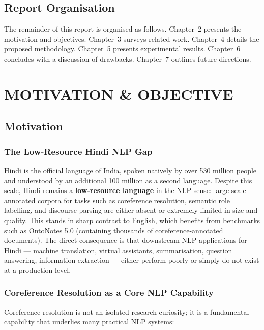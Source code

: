 \documentclass[12pt,a4paper]{report}
\begin{document}
\section{Report Organisation}

The remainder of this report is organised as follows. Chapter~2 presents the motivation and objectives. Chapter~3 surveys related work. Chapter~4 details the proposed methodology. Chapter~5 presents experimental results. Chapter~6 concludes with a discussion of drawbacks. Chapter~7 outlines future directions.


\chapter{MOTIVATION \& OBJECTIVE}

\section{Motivation}

\subsection{The Low-Resource Hindi NLP Gap}

Hindi is the official language of India, spoken natively by over 530 million people and understood by an additional 100 million as a second language. Despite this scale, Hindi remains a \textbf{low-resource language} in the NLP sense: large-scale annotated corpora for tasks such as coreference resolution, semantic role labelling, and discourse parsing are either absent or extremely limited in size and quality. This stands in sharp contrast to English, which benefits from benchmarks such as OntoNotes 5.0 (containing thousands of coreference-annotated documents). The direct consequence is that downstream NLP applications for Hindi --- machine translation, virtual assistants, summarisation, question answering, information extraction --- either perform poorly or simply do not exist at a production level.

\subsection{Coreference Resolution as a Core NLP Capability}

Coreference resolution is not an isolated research curiosity; it is a fundamental capability that underlies many practical NLP systems:
\end{document}

